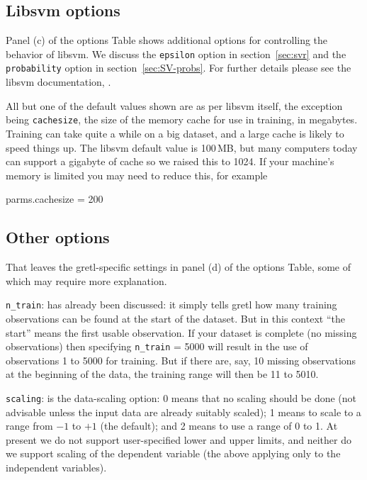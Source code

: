 \documentclass{article}
\begin{document}
\subsection{Libsvm options}
\label{sec:libsvm-options}

Panel (c) of the options Table shows additional options for
controlling the behavior of \textsf{libsvm}. We discuss the
\texttt{epsilon} option in section~\ref{sec:svr} and the
\texttt{probability} option in section~\ref{sec:SV-probs}. For further
details please see the \textsf{libsvm} documentation, \cite{HCL16}.

All but one of the default values shown are as per \textsf{libsvm}
itself, the exception being \texttt{cachesize}, the size of the memory
cache for use in training, in megabytes. Training can take quite a
while on a big dataset, and a large cache is likely to speed things
up. The \textsf{libsvm} default value is 100\,MB, but many computers
today can support a gigabyte of cache so we raised this to 1024. If
your machine's memory is limited you may need to reduce this, for
example
\begin{code}
parms.cachesize = 200
\end{code}

\subsection{Other options}
\label{sec:gretl-options}

That leaves the gretl-specific settings in panel (d) of the options
Table, some of which may require more explanation.

\texttt{n\_train}: has already been discussed: it simply tells gretl
how many training observations can be found at the start of the
dataset. But in this context ``the start'' means the first usable
observation. If your dataset is complete (no missing observations)
then specifying \texttt{n\_train} = 5000 will result in the use of
observations 1 to 5000 for training. But if there are, say, 10 missing
observations at the beginning of the data, the training range will
then be 11 to 5010.

\texttt{scaling}: is the data-scaling option: 0 means that no scaling
should be done (not advisable unless the input data are already
suitably scaled); 1 means to scale to a range from $-1$ to $+1$ (the
default); and 2 means to use a range of 0 to 1. At present we do not
support user-specified lower and upper limits, and neither do we
support scaling of the dependent variable (the above applying only to
the independent variables).
\end{document}
